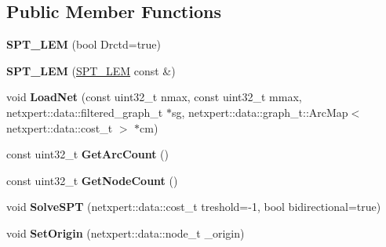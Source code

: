 \subsection*{Public Member Functions}
\begin{DoxyCompactItemize}
\item 
{\bfseries S\+P\+T\+\_\+\+L\+EM} (bool Drctd=true)\hypertarget{classnetxpert_1_1core_1_1SPT__LEM_ae8e11d1fcea636622f3c5d00e4642906}{}\label{classnetxpert_1_1core_1_1SPT__LEM_ae8e11d1fcea636622f3c5d00e4642906}

\item 
{\bfseries S\+P\+T\+\_\+\+L\+EM} (\hyperlink{classnetxpert_1_1core_1_1SPT__LEM}{S\+P\+T\+\_\+\+L\+EM} const \&)\hypertarget{classnetxpert_1_1core_1_1SPT__LEM_a1b1e3f1f5e6fb2a475395df5de1c8f7f}{}\label{classnetxpert_1_1core_1_1SPT__LEM_a1b1e3f1f5e6fb2a475395df5de1c8f7f}

\item 
void {\bfseries Load\+Net} (const uint32\+\_\+t nmax, const uint32\+\_\+t mmax, netxpert\+::data\+::filtered\+\_\+graph\+\_\+t $\ast$sg, netxpert\+::data\+::graph\+\_\+t\+::\+Arc\+Map$<$ netxpert\+::data\+::cost\+\_\+t $>$ $\ast$cm)\hypertarget{classnetxpert_1_1core_1_1SPT__LEM_a8fb936136e0c7e6c9f9e5eea9c7acba0}{}\label{classnetxpert_1_1core_1_1SPT__LEM_a8fb936136e0c7e6c9f9e5eea9c7acba0}

\item 
const uint32\+\_\+t {\bfseries Get\+Arc\+Count} ()\hypertarget{classnetxpert_1_1core_1_1SPT__LEM_acb011f54ba18bc9c5e2709129137fd72}{}\label{classnetxpert_1_1core_1_1SPT__LEM_acb011f54ba18bc9c5e2709129137fd72}

\item 
const uint32\+\_\+t {\bfseries Get\+Node\+Count} ()\hypertarget{classnetxpert_1_1core_1_1SPT__LEM_a15b68704ba3c584b3fbd66b283e54556}{}\label{classnetxpert_1_1core_1_1SPT__LEM_a15b68704ba3c584b3fbd66b283e54556}

\item 
void {\bfseries Solve\+S\+PT} (netxpert\+::data\+::cost\+\_\+t treshold=-\/1, bool bidirectional=true)\hypertarget{classnetxpert_1_1core_1_1SPT__LEM_a0baaa3bca3fbc8fcaeb97497735b0d93}{}\label{classnetxpert_1_1core_1_1SPT__LEM_a0baaa3bca3fbc8fcaeb97497735b0d93}

\item 
void {\bfseries Set\+Origin} (netxpert\+::data\+::node\+\_\+t \+\_\+origin)\hypertarget{classnetxpert_1_1core_1_1SPT__LEM_aacd93e8aa563539216b60b43c19871cc}{}\label{classnetxpert_1_1core_1_1SPT__LEM_aacd93e8aa563539216b60b43c19871cc}


\end{DoxyCompactItemize}

